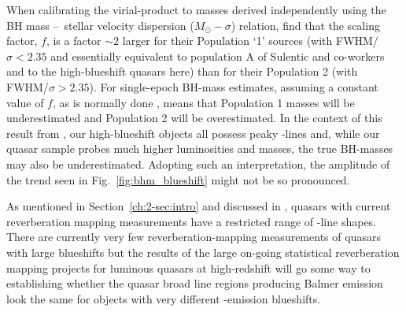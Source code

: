 When calibrating the virial-product to masses derived independently using the BH mass \---\ stellar velocity dispersion ($M_\odot-\sigma$) relation, \citet{collin06} find that the scaling factor, $f$, is a factor $\sim2$ larger for their Population `1' sources (with FWHM/$\sigma < 2.35$ and essentially equivalent to population A of Sulentic and co-workers and to the high-blueshift quasars here) than for their Population 2 (with FWHM/$\sigma > 2.35$). 
For single-epoch BH-mass estimates, assuming a constant value of $f$, as is normally done \citep[e.g.][]{vestergaard06}, means that Population 1 masses will be underestimated and Population 2 will be overestimated.
In the context of this result from \citet{collin06}, our high-blueshift objects all possess peaky \hans-lines and, while our quasar sample probes much higher luminosities and masses, the true BH-masses may also be underestimated.
Adopting such an interpretation, the amplitude of the trend seen in Fig.~\ref{fig:bhm_blueshift} might not be so pronounced.

As mentioned in Section~\ref{ch:2-sec:intro} and discussed in \citet{richards11}, quasars with current reverberation mapping measurements have a restricted range of -line shapes. 
There are currently very few reverberation-mapping measurements of quasars with large  blueshifts but the results of the large on-going statistical reverberation mapping projects \citep[e.g.][]{shen15} for luminous quasars at high-redshift will go some way to establishing whether the quasar broad line regions producing Balmer emission look the same for objects with very different -emission blueshifts. 

